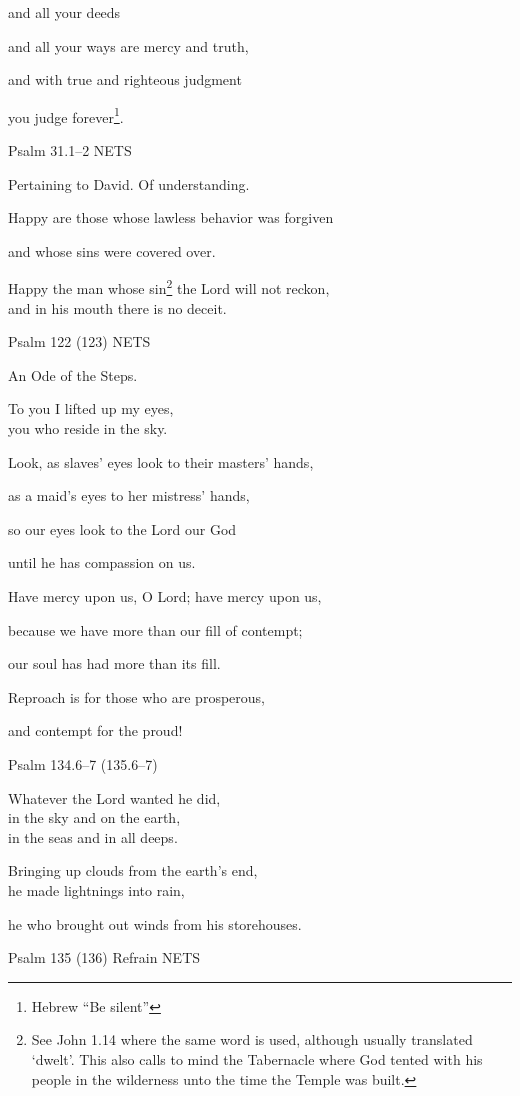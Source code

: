 \documentclass[
]{article}
\newcommand{\RL}[1]{\beginR #1\endR}
\begin{document}
and all your deeds

and all your ways are mercy and truth,

and with true and righteous judgment

you judge forever\footnote{Hebrew ``Be silent''}.

Psalm 31.1--2 NETS

Pertaining to David. Of understanding.

Happy are those whose lawless behavior was forgiven

and whose sins were covered over.

Happy the man whose sin\footnote{See John 1.14 where the same word is
  used, although usually translated `dwelt'. This also calls to mind the
  Tabernacle where God tented with his people in the wilderness unto the
  time the Temple was built.} the Lord will not reckon,\\
and in his mouth there is no deceit.

Psalm 122 (123) NETS

An Ode of the Steps.

To you I lifted up my eyes,\\
you who reside in the sky.

Look, as slaves\RL{'} eyes look to their masters\RL{'} hands,

as a maid\RL{'}s eyes to her mistress\RL{'} hands,

so our eyes look to the Lord our God

until he has compassion on us.

Have mercy upon us, O Lord; have mercy upon us,

because we have more than our fill of contempt;

our soul has had more than its fill.

Reproach is for those who are prosperous,

and contempt for the proud!

Psalm 134.6--7 (135.6--7)

Whatever the Lord wanted he did,\\
in the sky and on the earth,\\
in the seas and in all deeps.

Bringing up clouds from the earth\RL{'}s end,\\
he made lightnings into rain,

he who brought out winds from his storehouses.

Psalm 135 (136) Refrain NETS
\end{document}
